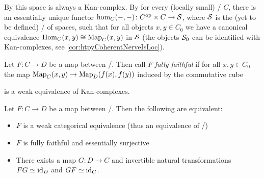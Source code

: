 \begin{remark}\label{rmk:functorialMappingSpace}
    By \cite[116]{cisinski_2019} this space is always a Kan-complex.
    By \cite[248]{cisinski_2019} for every (locally small) \inftycat/ $C$, there is an essentially unique functor $\hom_C(-,-)\colon C^{\operatorname{op}}\times C\to\mathcal{S}$, where $\mathcal{S}$ is the (yet to be defined) \inftycat/ of spaces, such that for all objects $x,y\in C_0$ we have a canonical equivalence $\operatorname{Hom}_C(x,y)\cong\operatorname{Map}_C(x,y)$ in $\mathcal{S}$ (the objects $\mathcal{S}_0$ can be identified with Kan-complexes, see \cref{cor:htpyCoherentNerveIsLoc}).
\end{remark}
\begin{definition}
    Let $F\colon C\to D$ be a map between \inftycats/.
    Then call $F$ \emph{fully faithful} if for all $x,y\in C_0$ the map $\operatorname{Map}_C(x,y)\to\operatorname{Map}_D(f(x),f(y))$ induced by the commutative cube
    \begin{center}
    \end{center}
    is a weak equivalence of Kan-complexes.
\end{definition}
\begin{thm}
    Let $F\colon C\to D$ be a map between \inftycats/.
    Then the following are equivalent:
    \begin{itemize}
        \item $F$ is a weak categorical equivalence (thus an equivalence of \inftycats/)
        \item $F$ is fully faithful and essentially surjective %
        \item There exists a map $G\colon D\to C$ and invertible natural transformations $FG\simeq \text{id}_D$ and $GF\simeq \text{id}_C$.
    \end{itemize}
    \begin{reference}
        \cite[Corollary 3.6.6 and Theorem 3.9.7]{cisinski_2019}
    \end{reference}
\end{thm}
